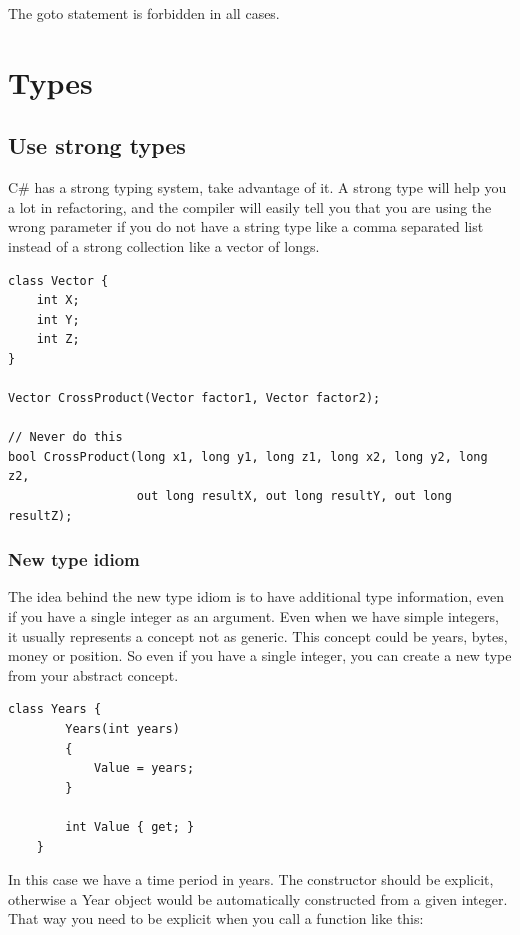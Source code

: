 \documentclass[11pt,a4paper]{article}
\begin{document}
The goto statement is forbidden in all cases.

\section{Types}

\subsection{Use strong types}

C\# has a strong typing system, take advantage of it. A strong type will help you a lot in refactoring, and the compiler will easily tell you that you are using the wrong parameter if you do not have a string type like a comma separated list instead of a strong collection like a vector of longs.

\begin{lstlisting}[language={[Sharp]C}, caption={Create a strong type}]
class Vector {
    int X;
    int Y;
    int Z;
}

Vector CrossProduct(Vector factor1, Vector factor2);

// Never do this
bool CrossProduct(long x1, long y1, long z1, long x2, long y2, long z2,
                  out long resultX, out long resultY, out long resultZ);
\end{lstlisting}

\subsubsection{New type idiom}
The idea behind the new type idiom is to have additional type information, even if you have a single integer as an argument. Even when we have simple integers, it usually represents a concept not as generic. This concept could be years, bytes, money or position. 
 So even if you have a single integer, you can create a new type from your abstract concept.

\begin{lstlisting}[language={[Sharp]C}, caption={Declaring the new type Years}]
    class Years {
        Years(int years)
        {
            Value = years;
        }

        int Value { get; }
    }
\end{lstlisting}

In this case we have a time period in years. The constructor should be explicit, otherwise a Year object would be automatically constructed from a given integer. That way you need to be explicit when you call a function like this:
\end{document}
